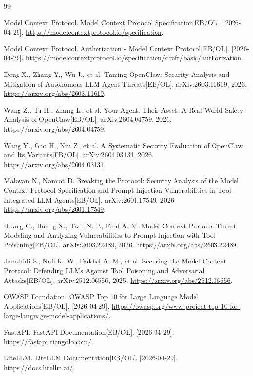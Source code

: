 \documentclass[UTF8,zihao=-4,scheme=chinese,fontset=none]{ctexart}
\begin{document}
\clearpage
\begin{thebibliography}{99}

 Model Context Protocol. Model Context Protocol Specification[EB/OL]. [2026-04-29]. \url{https://modelcontextprotocol.io/specification}.

 Model Context Protocol. Authorization - Model Context Protocol[EB/OL]. [2026-04-29]. \url{https://modelcontextprotocol.io/specification/draft/basic/authorization}.

 Deng X., Zhang Y., Wu J., et al. Taming OpenClaw: Security Analysis and Mitigation of Autonomous LLM Agent Threats[EB/OL]. arXiv:2603.11619, 2026. \url{https://arxiv.org/abs/2603.11619}.

 Wang Z., Tu H., Zhang L., et al. Your Agent, Their Asset: A Real-World Safety Analysis of OpenClaw[EB/OL]. arXiv:2604.04759, 2026. \url{https://arxiv.org/abs/2604.04759}.

 Wang Y., Gao H., Niu Z., et al. A Systematic Security Evaluation of OpenClaw and Its Variants[EB/OL]. arXiv:2604.03131, 2026. \url{https://arxiv.org/abs/2604.03131}.

 Maloyan N., Namiot D. Breaking the Protocol: Security Analysis of the Model Context Protocol Specification and Prompt Injection Vulnerabilities in Tool-Integrated LLM Agents[EB/OL]. arXiv:2601.17549, 2026. \url{https://arxiv.org/abs/2601.17549}.

 Huang C., Huang X., Tran N. P., Fard A. M. Model Context Protocol Threat Modeling and Analyzing Vulnerabilities to Prompt Injection with Tool Poisoning[EB/OL]. arXiv:2603.22489, 2026. \url{https://arxiv.org/abs/2603.22489}.

 Jamshidi S., Nafi K. W., Dakhel A. M., et al. Securing the Model Context Protocol: Defending LLMs Against Tool Poisoning and Adversarial Attacks[EB/OL]. arXiv:2512.06556, 2025. \url{https://arxiv.org/abs/2512.06556}.

 OWASP Foundation. OWASP Top 10 for Large Language Model Applications[EB/OL]. [2026-04-29]. \url{https://owasp.org/www-project-top-10-for-large-language-model-applications/}.

 FastAPI. FastAPI Documentation[EB/OL]. [2026-04-29]. \url{https://fastapi.tiangolo.com/}.

 LiteLLM. LiteLLM Documentation[EB/OL]. [2026-04-29]. \url{https://docs.litellm.ai/}.


\end{thebibliography}
\end{document}
